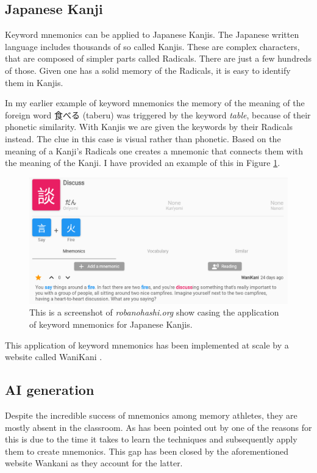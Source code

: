 \subsection{Japanese Kanji}
Keyword mnemonics can be applied to Japanese Kanjis. The Japanese written language includes thousands of so called Kanjis. These are complex characters, that are composed of simpler parts called Radicals. There are just a few hundreds of those. Given one has a solid memory of the Radicals, it is easy to identify them in Kanjis.

In my earlier example of keyword mnemonics the memory of the meaning of the foreign word 食べる (taberu) was triggered by the keyword \emph{table}, because of their phonetic similarity. With Kanjis we are given the keywords by their Radicals instead. The clue in this case is visual rather than phonetic. Based on the meaning of a Kanji's Radicals one creates a mnemonic that connects them with the meaning of the Kanji. I have provided an example of this in Figure \ref{figure:robanohashi_example}.

\begin{figure}
    \centering
    \includegraphics[width=400pt]{resources/robanohashi_example.png}
    \caption{This is a screenshot of \emph{robanohashi.org} show casing the application of keyword mnemonics for Japanese Kanjis.}
    \label{figure:robanohashi_example}
\end{figure}
This application of keyword mnemonics has been implemented at scale by a website called WaniKani \cite{wanikani}. 

\subsection{AI generation}
Despite the incredible success of mnemonics among memory athletes, they are mostly absent in the classroom. As has been pointed out by \cite{putnam_2015} one of the reasons for this is due to the time it takes to learn the techniques and subsequently apply them to create mnemonics. This gap has been closed by the aforementioned website Wankani as they account for the latter. 

